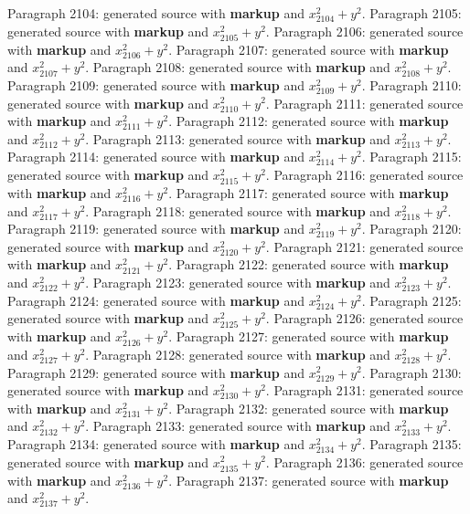 \documentclass{article}
\begin{document}
Paragraph 2104: generated source with \textbf{markup} and $x_{2104}^2 + y^2$.
Paragraph 2105: generated source with \textbf{markup} and $x_{2105}^2 + y^2$.
Paragraph 2106: generated source with \textbf{markup} and $x_{2106}^2 + y^2$.
Paragraph 2107: generated source with \textbf{markup} and $x_{2107}^2 + y^2$.
Paragraph 2108: generated source with \textbf{markup} and $x_{2108}^2 + y^2$.
Paragraph 2109: generated source with \textbf{markup} and $x_{2109}^2 + y^2$.
Paragraph 2110: generated source with \textbf{markup} and $x_{2110}^2 + y^2$.
Paragraph 2111: generated source with \textbf{markup} and $x_{2111}^2 + y^2$.
Paragraph 2112: generated source with \textbf{markup} and $x_{2112}^2 + y^2$.
Paragraph 2113: generated source with \textbf{markup} and $x_{2113}^2 + y^2$.
Paragraph 2114: generated source with \textbf{markup} and $x_{2114}^2 + y^2$.
Paragraph 2115: generated source with \textbf{markup} and $x_{2115}^2 + y^2$.
Paragraph 2116: generated source with \textbf{markup} and $x_{2116}^2 + y^2$.
Paragraph 2117: generated source with \textbf{markup} and $x_{2117}^2 + y^2$.
Paragraph 2118: generated source with \textbf{markup} and $x_{2118}^2 + y^2$.
Paragraph 2119: generated source with \textbf{markup} and $x_{2119}^2 + y^2$.
Paragraph 2120: generated source with \textbf{markup} and $x_{2120}^2 + y^2$.
Paragraph 2121: generated source with \textbf{markup} and $x_{2121}^2 + y^2$.
Paragraph 2122: generated source with \textbf{markup} and $x_{2122}^2 + y^2$.
Paragraph 2123: generated source with \textbf{markup} and $x_{2123}^2 + y^2$.
Paragraph 2124: generated source with \textbf{markup} and $x_{2124}^2 + y^2$.
Paragraph 2125: generated source with \textbf{markup} and $x_{2125}^2 + y^2$.
Paragraph 2126: generated source with \textbf{markup} and $x_{2126}^2 + y^2$.
Paragraph 2127: generated source with \textbf{markup} and $x_{2127}^2 + y^2$.
Paragraph 2128: generated source with \textbf{markup} and $x_{2128}^2 + y^2$.
Paragraph 2129: generated source with \textbf{markup} and $x_{2129}^2 + y^2$.
Paragraph 2130: generated source with \textbf{markup} and $x_{2130}^2 + y^2$.
Paragraph 2131: generated source with \textbf{markup} and $x_{2131}^2 + y^2$.
Paragraph 2132: generated source with \textbf{markup} and $x_{2132}^2 + y^2$.
Paragraph 2133: generated source with \textbf{markup} and $x_{2133}^2 + y^2$.
Paragraph 2134: generated source with \textbf{markup} and $x_{2134}^2 + y^2$.
Paragraph 2135: generated source with \textbf{markup} and $x_{2135}^2 + y^2$.
Paragraph 2136: generated source with \textbf{markup} and $x_{2136}^2 + y^2$.
Paragraph 2137: generated source with \textbf{markup} and $x_{2137}^2 + y^2$.
\end{document}
